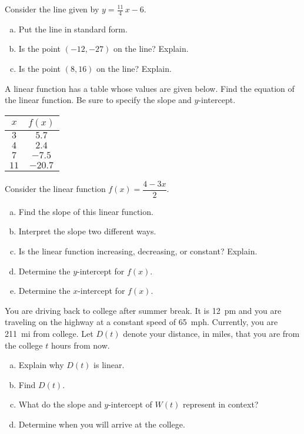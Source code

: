 \documentclass[11pt,letterpaper]{article}
\begin{document}
\newpage



 Consider the line given by $y= \frac{11}{4}\,x - 6$.
        \begin{enumerate}[(a)]
        \item Put the line in standard form.
        \item Is the point $(-12, -27)$ on the line? Explain.
        \item Is the point $(8, 16)$ on the line? Explain. 
        \end{enumerate} 



\newpage



 A linear function has a table whose values are given below. Find the equation of the linear function. Be sure to specify the slope and $y$-intercept.
	\begin{table}[!ht]
	\centering
	\begin{tabular}{c|c}
	$x$ & $f(x)$ \\ \hline
	$3$ & $5.7$ \\ 
	$4$ & $2.4$ \\
	$7$ & $-7.5$ \\
	$11$ & $-20.7$
	\end{tabular}
	\end{table}



\newpage



 Consider the linear function $f(x)= \dfrac{4 - 3x}{2}$.
	\begin{enumerate}[(a)]
	\item Find the slope of this linear function. 
	\item Interpret the slope two different ways.
	\item Is the linear function increasing, decreasing, or constant? Explain. 
	\item Determine the $y$-intercept for $f(x)$.
	\item Determine the $x$-intercept for $f(x)$.
	\end{enumerate} 



\newpage



 You are driving back to college after summer break. It is 12~pm and you are traveling on the highway at a constant speed of 65~mph. Currently, you are 211~mi from college. Let $D(t)$ denote your distance, in miles, that you are from the college $t$ hours from now. 
	\begin{enumerate}[(a)]
	\item Explain why $D(t)$ is linear.
	\item Find $D(t)$. 
	\item What do the slope and $y$-intercept of $W(t)$ represent in context?
	\item Determine when you will arrive at the college. 
	\end{enumerate} 
\end{document}
